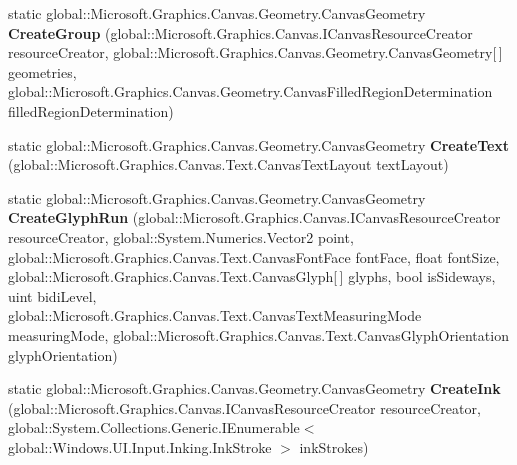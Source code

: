 \begin{DoxyCompactItemize}
static global\+::\+Microsoft.\+Graphics.\+Canvas.\+Geometry.\+Canvas\+Geometry {\bfseries Create\+Group} (global\+::\+Microsoft.\+Graphics.\+Canvas.\+I\+Canvas\+Resource\+Creator resource\+Creator, global\+::\+Microsoft.\+Graphics.\+Canvas.\+Geometry.\+Canvas\+Geometry\mbox{[}$\,$\mbox{]} geometries, global\+::\+Microsoft.\+Graphics.\+Canvas.\+Geometry.\+Canvas\+Filled\+Region\+Determination filled\+Region\+Determination)
\item 
\mbox{\label{class_microsoft_1_1_graphics_1_1_canvas_1_1_geometry_1_1_canvas_geometry_a5c956c37368cb565497e9e95f12918df}} 
static global\+::\+Microsoft.\+Graphics.\+Canvas.\+Geometry.\+Canvas\+Geometry {\bfseries Create\+Text} (global\+::\+Microsoft.\+Graphics.\+Canvas.\+Text.\+Canvas\+Text\+Layout text\+Layout)
\item 
\mbox{\label{class_microsoft_1_1_graphics_1_1_canvas_1_1_geometry_1_1_canvas_geometry_aac0a557b41812921ee04b4413f0fb8f1}} 
static global\+::\+Microsoft.\+Graphics.\+Canvas.\+Geometry.\+Canvas\+Geometry {\bfseries Create\+Glyph\+Run} (global\+::\+Microsoft.\+Graphics.\+Canvas.\+I\+Canvas\+Resource\+Creator resource\+Creator, global\+::\+System.\+Numerics.\+Vector2 point, global\+::\+Microsoft.\+Graphics.\+Canvas.\+Text.\+Canvas\+Font\+Face font\+Face, float font\+Size, global\+::\+Microsoft.\+Graphics.\+Canvas.\+Text.\+Canvas\+Glyph\mbox{[}$\,$\mbox{]} glyphs, bool is\+Sideways, uint bidi\+Level, global\+::\+Microsoft.\+Graphics.\+Canvas.\+Text.\+Canvas\+Text\+Measuring\+Mode measuring\+Mode, global\+::\+Microsoft.\+Graphics.\+Canvas.\+Text.\+Canvas\+Glyph\+Orientation glyph\+Orientation)
\item 
\mbox{\label{class_microsoft_1_1_graphics_1_1_canvas_1_1_geometry_1_1_canvas_geometry_a42466cc94da19392c5dd77f1fd235a67}} 
static global\+::\+Microsoft.\+Graphics.\+Canvas.\+Geometry.\+Canvas\+Geometry {\bfseries Create\+Ink} (global\+::\+Microsoft.\+Graphics.\+Canvas.\+I\+Canvas\+Resource\+Creator resource\+Creator, global\+::\+System.\+Collections.\+Generic.\+I\+Enumerable$<$ global\+::\+Windows.\+U\+I.\+Input.\+Inking.\+Ink\+Stroke $>$ ink\+Strokes)
\item 
\mbox{\label{class_microsoft_1_1_graphics_1_1_canvas_1_1_geometry_1_1_canvas_geometry_a2ab66ac5c29e306f56d21b3368d42415}} 

\end{DoxyCompactItemize}
